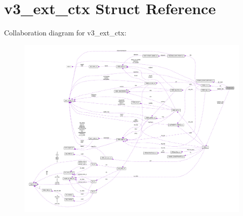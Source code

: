 \hypertarget{structv3__ext__ctx}{}\section{v3\+\_\+ext\+\_\+ctx Struct Reference}
\label{structv3__ext__ctx}


Collaboration diagram for v3\+\_\+ext\+\_\+ctx\+:
\nopagebreak
\begin{figure}[H]
\begin{center}
\leavevmode
\includegraphics[width=350pt]{structv3__ext__ctx__coll__graph}
\end{center}
\end{figure}
